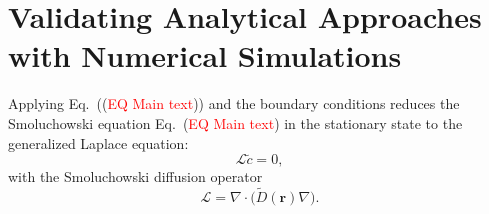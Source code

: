 \documentclass[10pt, a4paper]{article}
\newcommand\todo[1]{\textcolor{red}{#1}}
\begin{document}
\section{Validating Analytical Approaches with Numerical Simulations}
\begin{multicols}{2}




Applying Eq.~((\todo{EQ Main text})) and the boundary conditions reduces the Smoluchowski equation Eq.~(\todo{EQ Main text}) in the stationary state to the generalized Laplace equation:
\begin{equation}
  \mathcal L\tilde c=0,
  \label{eq:laplace}
\end{equation}
with the Smoluchowski diffusion operator
\begin{equation*}
  \mathcal L=\nabla\!\cdot\!\bigl(\tilde D(\bm r)\nabla\bigr).
\end{equation*}




\end{multicols}
\end{document}
